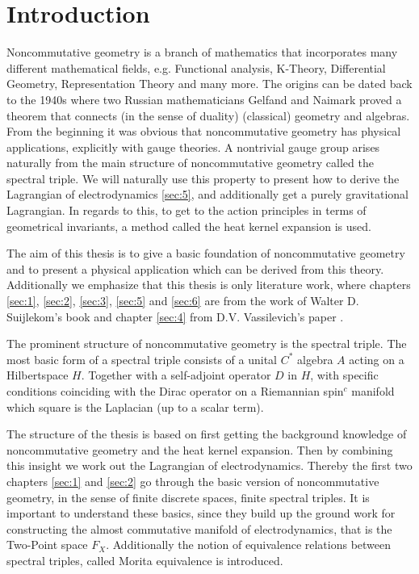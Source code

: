 \section{Introduction}
Noncommutative geometry is a branch of mathematics that incorporates many
different mathematical fields, e.g. Functional analysis, K-Theory,
Differential Geometry, Representation Theory and many more. The origins can
be dated back to the 1940s where two Russian mathematicians Gelfand and
Naimark proved a theorem that connects (in the sense of duality) (classical)
geometry and algebras. From the beginning it was obvious that noncommutative
geometry has physical applications, explicitly with gauge theories. A
nontrivial gauge group arises naturally from the main structure of
noncommutative geometry called the spectral triple. We will naturally use
this property to present how to derive the Lagrangian of electrodynamics
\ref{sec:5}, and additionally get a purely gravitational Lagrangian.
In regards to this, to get to the action principles in terms of geometrical
invariants, a method called the heat kernel expansion is used.

The aim of this thesis is to give a basic foundation of noncommutative
geometry and to present a physical application which can be derived from this
theory. Additionally we emphasize that this thesis is only literature work,
where chapters \ref{sec:1}, \ref{sec:2}, \ref{sec:3}, \ref{sec:5} and \ref{sec:6} are from
the work of Walter D. Suijlekom's book \cite{ncgwalter} and chapter
\ref{sec:4} from D.V. Vassilevich's paper \cite{heatkernel}.

The prominent structure of noncommutative geometry is the spectral triple.
The most basic form of a spectral triple consists of a unital $C^*$ algebra
$A$ acting on a Hilbertspace $H$. Together with a self-adjoint operator $D$ in
$H$, with specific conditions coinciding with the Dirac operator on
a Riemannian spin$^c$ manifold which square is the Laplacian (up to a scalar
term).

The structure of the thesis is based on first getting the background
knowledge of noncommutative geometry and the heat kernel expansion. Then by
combining this insight we work out the Lagrangian of electrodynamics. Thereby
the first two chapters \ref{sec:1} and \ref{sec:2} go through the basic
version of noncommutative geometry, in the sense of finite discrete spaces,
finite spectral triples. It is important to understand these basics, since
they build up the ground work for constructing the almost commutative
manifold of electrodynamics, that is the Two-Point space $F_X$. Additionally
the notion of equivalence relations between spectral triples, called Morita
equivalence is introduced.

